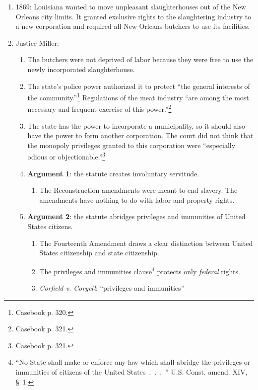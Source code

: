\begin{enumerate}
    \item 1869: Louisiana wanted to move unpleasant slaughterhouses out of the 
    New Orleans city limits. It granted exclusive rights to the slaughtering 
    industry to a new corporation and required all New Orleans butchers to use 
    its facilities. 
    \item Justice Miller:
    \begin{enumerate}
        \item The butchers were not deprived of labor because they were free 
        to use the newly incorporated slaughterhouse.
        \item The state's police power authorized it to protect ``the general 
        interests of the community.''\footnote{Casebook p. 320.} Regulations of 
        the meat industry ``are among the most necessary and frequent exercise 
        of this power.''\footnote{Casebook p. 321.}
        \item The state has the power to incorporate a municipality, so it 
        should also have the power to form another corporation. The court did 
        not think that the monopoly privileges granted to this corporation 
        were ``especially odious or objectionable.''\footnote{Casebook p. 321.}
        \item \textbf{Argument 1}: the statute creates involuntary servitude.
        \begin{enumerate}
            \item The Reconstruction amendments were meant to end slavery. 
            The amendments have nothing to do with labor and property rights.
        \end{enumerate}
        \item \textbf{Argument 2}: the statute abridges privileges and 
        immunities of United States citizens.
        \begin{enumerate}
            \item The Fourteenth Amendment draws a clear distinction between 
            United States citizenship and state citizenship.
            \item The privileges and immunities clause\footnote{``No State 
            shall make or enforce any law which shall abridge the privileges 
            or immunities of citizens of the United States~.~.~.~'' U.S. 
            Const. amend. XIV, \S\ 1.} protects only \emph{federal} rights.
            \item \emph{Corfield v. Coryell}: ``privileges and immunities'' 

\end{enumerate}
\end{enumerate}
\end{enumerate}
